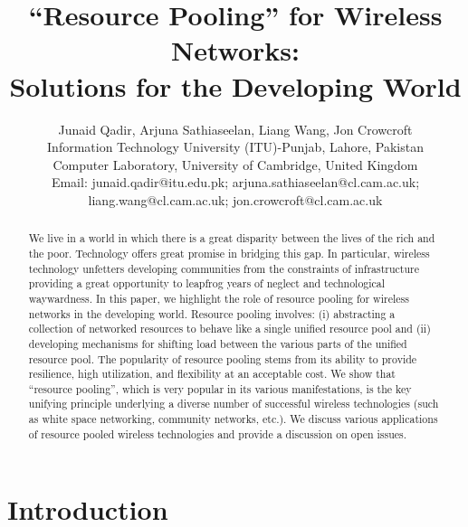 \documentclass{sigcomm-alternate}
\begin{document}
\title{``Resource Pooling'' for Wireless Networks: \\Solutions for the Developing World}
\author{\large Junaid Qadir, Arjuna Sathiaseelan, Liang Wang, Jon Crowcroft\\
\normalsize Information Technology University (ITU)-Punjab, Lahore, Pakistan\\
\normalsize Computer Laboratory, University of Cambridge, United Kingdom\\
\normalsize Email: junaid.qadir@itu.edu.pk; arjuna.sathiaseelan@cl.cam.ac.uk; liang.wang@cl.cam.ac.uk; jon.crowcroft@cl.cam.ac.uk\\}
\maketitle

\begin{abstract}

We live in a world in which there is a great disparity between the lives of the rich and the poor. Technology offers great promise in bridging this gap. In particular, wireless technology unfetters developing communities from the constraints of infrastructure providing a great opportunity to leapfrog years of neglect and technological waywardness. In this paper, we highlight the role of resource pooling for wireless networks in the developing world. Resource pooling involves: (i) abstracting a collection of networked resources to behave like a single unified resource pool and (ii) developing mechanisms for shifting load between the various parts of the unified resource pool. The popularity of resource pooling stems from its ability to provide resilience, high utilization,  and flexibility at an acceptable cost. We show that ``resource pooling'', which is very popular in its various manifestations, is the key unifying principle underlying a diverse number of successful wireless technologies (such as white space networking, community networks, etc.). We discuss various applications of resource pooled wireless technologies and provide a discussion on open issues.

\end{abstract}

\section{Introduction}
\end{document}

